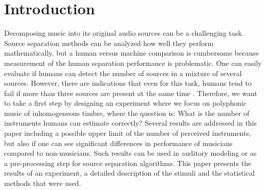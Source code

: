 \renewcommand{\rothead}[2][90]{\makebox[0mm][l]{\rotatebox{#1}{\makecell[c]{#2}}}}%
\renewcommand{\arraystretch}{1.4}

\newcommand*\node[1]{
\unitlength1ex
\begin{picture}(2.5,2.5)
\put(0.75,0.75){
	\circle{3}}
	\put(0.7,0.7){
		\makebox(0,0){#1}
	}
\end{picture}
}

\section{Introduction}
Decomposing music into its original audio sources can be a challenging task. Source separation methods can be analyzed how well they perform mathematically, but a human versus machine comparison is cumbersome because measurement of the human separation performance is problematic. One can easily evaluate if humans can detect the number of sources in a mixture of several sources. However, there are indications that even for this task, humans tend to fail if more than three sources are present at the same time \cite{huron89}. Therefore, we want to take a first step by designing an experiment where we focus on polyphonic music of inhomogeneous timbre, where the question is: What is the number of instruments humans can estimate correctly? Several results are addressed in this paper including a possible upper limit of the number of perceived instruments, but also if one can see significant differences in performance of musicians compared to non-musicians. Such results can be used in auditory modeling or as a pre-processing step for source separation algorithms.
This paper presents the results of an experiment, a detailed description of the stimuli and the statistical methods that were used.
\vspace{-1.0em}
